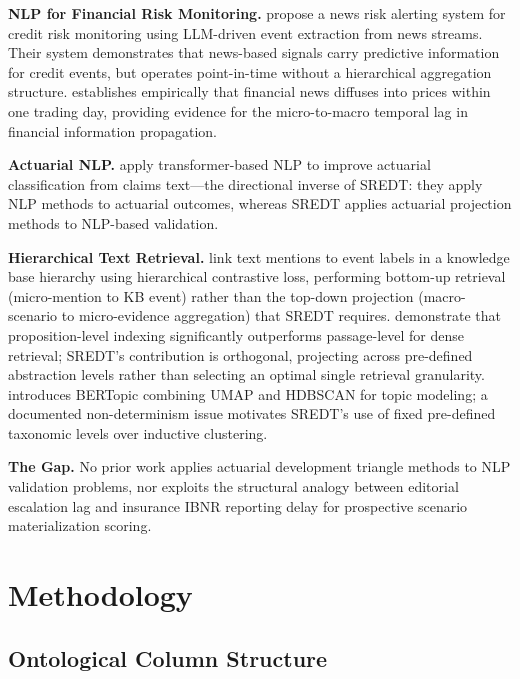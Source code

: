 \documentclass[11pt,letterpaper]{article}
\begin{document}
\textbf{NLP for Financial Risk Monitoring.} \citet{Nygaard2024} propose a news risk alerting system for credit risk monitoring using LLM-driven event extraction from news streams. Their system demonstrates that news-based signals carry predictive information for credit events, but operates point-in-time without a hierarchical aggregation structure. \citet{Peress2014} establishes empirically that financial news diffuses into prices within one trading day, providing evidence for the micro-to-macro temporal lag in financial information propagation.

\textbf{Actuarial NLP.} \citet{Troxler2022} apply transformer-based NLP to improve actuarial classification from claims text---the directional inverse of SREDT: they apply NLP methods to actuarial outcomes, whereas SREDT applies actuarial projection methods to NLP-based validation.

\textbf{Hierarchical Text Retrieval.} \citet{Ou2023} link text mentions to event labels in a knowledge base hierarchy using hierarchical contrastive loss, performing bottom-up retrieval (micro-mention to KB event) rather than the top-down projection (macro-scenario to micro-evidence aggregation) that SREDT requires. \citet{Chen2024} demonstrate that proposition-level indexing significantly outperforms passage-level for dense retrieval; SREDT's contribution is orthogonal, projecting across pre-defined abstraction levels rather than selecting an optimal single retrieval granularity. \citet{Grootendorst2022} introduces BERTopic combining UMAP and HDBSCAN for topic modeling; a documented non-determinism issue motivates SREDT's use of fixed pre-defined taxonomic levels over inductive clustering.

\textbf{The Gap.} No prior work applies actuarial development triangle methods to NLP validation problems, nor exploits the structural analogy between editorial escalation lag and insurance IBNR reporting delay for prospective scenario materialization scoring.

\section{Methodology}
\label{sec:methodology}

\subsection{Ontological Column Structure}
\end{document}
